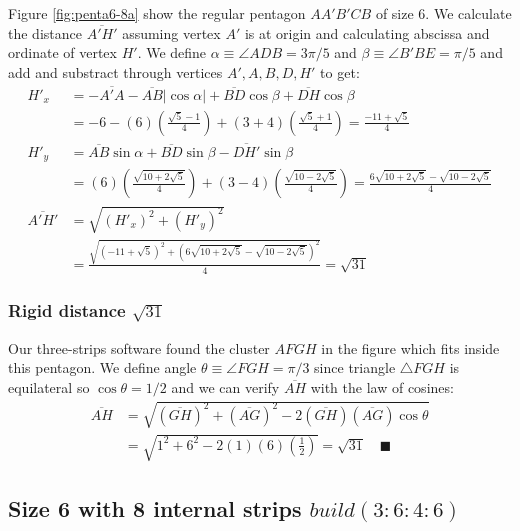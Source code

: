 \documentclass[11pt]{article}
\begin{document}
Figure \ref{fig:penta6-8a} show the regular pentagon $AA'B'CB$ of size $6$. We calculate the distance $\overline{A'H'}$ assuming vertex $A'$ is at origin and calculating abscissa and ordinate of vertex $H'$. We define $\alpha \equiv \angle{ADB} = 3\pi / 5$ and $\beta \equiv \angle{B'BE} = \pi / 5$ and add and substract through vertices $A',A,B,D,H'$ to get:
\begin{align}
H'_x &= -\overline{A'A} -\overline{AB}|\cos\alpha| + \overline{BD}\cos\beta + \overline{DH}\cos\beta \nonumber\\
 &= -6 -(6)\left(\frac{\sqrt5 - 1}4\right) + (3+4)\left(\frac{\sqrt5+1}4\right)
 = \frac{-11 + \sqrt5}4 \\
H'_y &= \overline{AB}\sin\alpha + \overline{BD}\sin\beta - \overline{DH'}\sin\beta \nonumber\\
 &= (6)\left(\frac{\sqrt{10+2\sqrt5}}4\right) + (3-4)\left(\frac{\sqrt{10-2\sqrt5}}4\right)
 = \frac{6\sqrt{10+2\sqrt5} - \sqrt{10-2\sqrt5}}4 \\
%
\overline{A'H'} &= \sqrt{(H'_x)^2 + (H'_y)^2} \nonumber\\
 &= \frac{\sqrt{(-11+\sqrt5)^2 + (6\sqrt{10+2\sqrt5} -\sqrt{10-2\sqrt5})^2}}4
 = \sqrt{31}
\end{align}

\subsubsection{Rigid distance $\sqrt{31}$}

Our three-strips software found the cluster $AFGH$ in the figure which fits inside this pentagon. We define angle $\theta \equiv \angle{FGH} = \pi / 3$ since triangle $\triangle{FGH}$ is equilateral so $\cos\theta = 1 / 2$ and we can verify $\overline{AH}$ with the law of cosines:
\begin{align}
\overline{AH} &= \sqrt{(\overline{GH})^2 + (\overline{AG})^2 
 - 2(\overline{GH})(\overline{AG})\cos\theta} \nonumber\\
 &= \sqrt{1^2 + 6^2 - 2(1)(6)\left(\frac{1}2\right)} = \sqrt{31} \quad \blacksquare
\end{align}

\subsection{Size 6 with 8 internal strips $build(3:6:4:6)$}
\end{document}
